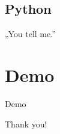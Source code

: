 \documentclass{beamer}
\begin{document}
		\subsection{Python}
			\begin{frame}{\insertsubsectionhead}
				„You tell me.”
			\end{frame}

	\section{Demo}
		\begin{frame}
			\begin{Huge}
				\centerline{Demo}
			\end{Huge}
		\end{frame}

	\begin{frame}
		\begin{Huge}
			\centerline{Thank you!}
		\end{Huge}
	\end{frame}
\end{document}

